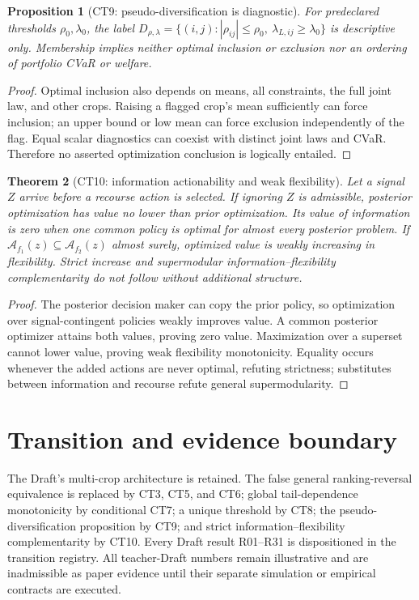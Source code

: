 \documentclass[11pt]{article}
\newtheorem{theorem}{Theorem}
\newtheorem{proposition}[theorem]{Proposition}
\theoremstyle{definition}
\begin{document}
\begin{proposition}[CT9: pseudo-diversification is diagnostic]\label{ct9}
For predeclared thresholds $\rho_0,\lambda_0$, the label
$D_{\rho,\lambda}=\{(i,j):|\rho_{ij}|\le\rho_0,\
\lambda_{L,ij}\ge\lambda_0\}$ is descriptive only.  Membership implies
neither optimal inclusion or exclusion nor an ordering of portfolio CVaR
or welfare.
\end{proposition}
\begin{proof}
Optimal inclusion also depends on means, all constraints, the full joint
law, and other crops.  Raising a flagged crop's mean sufficiently can force
inclusion; an upper bound or low mean can force exclusion independently of
the flag.  Equal scalar diagnostics can coexist with distinct joint laws
and CVaR.  Therefore no asserted optimization conclusion is logically
entailed.
\end{proof}

\begin{theorem}[CT10: information actionability and weak flexibility]\label{ct10}
Let a signal $Z$ arrive before a recourse action is selected.  If ignoring
$Z$ is admissible, posterior optimization has value no lower than prior
optimization.  Its value of information is zero when one common policy is
optimal for almost every posterior problem.  If
$\mathcal A_{f_1}(z)\subseteq\mathcal A_{f_2}(z)$ almost surely, optimized
value is weakly increasing in flexibility.  Strict increase and
supermodular information--flexibility complementarity do not follow
without additional structure.
\end{theorem}
\begin{proof}
The posterior decision maker can copy the prior policy, so optimization
over signal-contingent policies weakly improves value.  A common posterior
optimizer attains both values, proving zero value.  Maximization over a
superset cannot lower value, proving weak flexibility monotonicity.
Equality occurs whenever the added actions are never optimal, refuting
strictness; substitutes between information and recourse refute general
supermodularity.
\end{proof}

\section{Transition and evidence boundary}

The Draft's multi-crop architecture is retained.  The false general
ranking-reversal equivalence is replaced by CT3, CT5, and CT6; global
tail-dependence monotonicity by conditional CT7; a unique threshold by
CT8; the pseudo-diversification proposition by CT9; and strict
information--flexibility complementarity by CT10.  Every Draft result
R01--R31 is dispositioned in the transition registry.  All teacher-Draft
numbers remain illustrative and are inadmissible as paper evidence until
their separate simulation or empirical contracts are executed.
\end{document}
